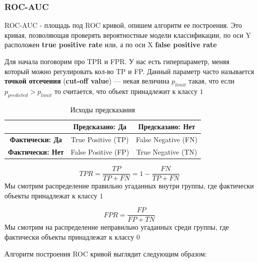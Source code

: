 \documentclass{article}
\begin{document}
    \subsubsection{ROC-AUC}

    ROC-AUC - площадь под ROC кривой, опишем алгоритм ее построения. 
    Это кривая, позволяющая проверять вероятностные модели классификации, по оси Y расположен \textbf{true positive rate} или, 
    а по оси X \textbf{false positive rate}

    Для начала поговорим про TPR и FPR. У нас есть гиперпараметр, меняя который можно регулировать кол-во TP и FP.
    Данный параметр часто называется \textbf{точкой отсечения} (\textbf{cut-off value}) --- некая величина
    $p_{limit}$ такая, что если $p_{predicted} > p_{limit}$ то считается, что объект принадлежит к классу $1$

    \quad

    \begin{table}[h] %
        \centering %
        \caption{Исходы предсказания} %
        \begin{tabular}{|c|c|c|}
            \hline
            & \textbf{Предсказано: Да} & \textbf{Предсказано: Нет} \\ \hline
            \textbf{Фактически: Да} & True Positive (TP) & False Negative (FN) \\ \hline
            \textbf{Фактически: Нет} & False Positive (FP) & True Negative (TN) \\ \hline
        \end{tabular}
    \end{table}

    \begin{equation}
        TPR = \dfrac{TP}{TP + FN} = 1 - \dfrac{FN}{TP + FN}
    \end{equation}
    Мы смотрим распределение правильно угаданных внутри группы, где фактически объекты принадлежат к классу $1$

    \begin{equation}
        FPR = \dfrac{FP}{FP + TN}
    \end{equation}
    Мы смотрим на распределение неправильно угаданных среди группы, где фактически объекты принадлежат к классу $0$


    Алгоритм построения ROC кривой выглядит следующим образом: 
\end{document}
